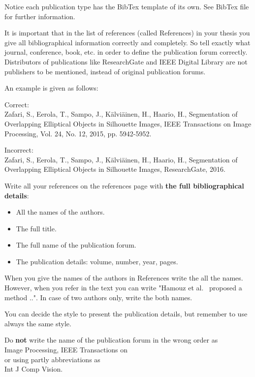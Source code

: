 \documentclass{lutmscthesis}[2017/10/03]
\begin{document}
Notice each publication type has the BibTex template of its own. See BibTex file for further information. 

It is important that in the list of references (called References) in your thesis you give all bibliographical information correctly and completely. So tell exactly what journal, conference, book, etc. in order to define the publication forum correctly. Distributors of publications like ResearchGate and IEEE Digital Library are not publishers to be mentioned, instead of original publication forums.

An example is given as follows:

Correct:\\
Zafari, S., Eerola, T., Sampo, J., Kälviäinen, H., Haario, H., Segmentation of Overlapping Elliptical Objects in Silhouette Images, IEEE Transactions on Image Processing, Vol. 24, No. 12, 2015, pp. 5942-5952.

Incorrect:\\
Zafari, S., Eerola, T., Sampo, J., Kälviäinen, H., Haario, H., Segmentation of Overlapping Elliptical Objects in Silhouette Images, ResearchGate, 2016. 

Write all your references on the references page with {\bf the full bibliographical details}: 
\vspace{-18pt}
\begin{itemize}
\itemsep=-4pt
\item All the names of the authors. 
\item The full title.
\item The full name of the publication forum. 
\item The publication details: volume, number, year, pages. 
\end{itemize}

When you give the names of the authors in References write the all the names. However, when you refer in the text you can write "Hamouz et al.~\cite{hamouz2005feature} proposed a method ..". In case of two authors only, write the both names. 

You can decide the style to present the publication details, but remember to use always the same style.

Do {\bf not} write the name of the publication forum in the wrong order as \\
Image Processing, IEEE Transactions on\\
or using partly abbreviations as\\
Int J Comp Vision.
\end{document}
